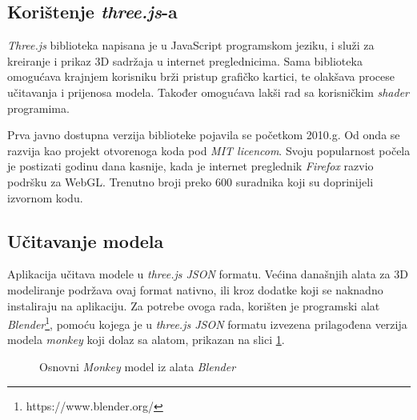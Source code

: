 \subsection{Korištenje \emph{three.js}-a}

\emph{Three.js} \cite{threejs-github} biblioteka napisana je u JavaScript programskom jeziku, i služi za kreiranje i prikaz 3D sadržaja u internet preglednicima. Sama biblioteka omogućava krajnjem korisniku brži pristup grafičko kartici, te olakšava procese učitavanja i prijenosa modela. Također omogućava lakši rad sa korisničkim \emph{shader} programima.

Prva javno dostupna verzija biblioteke pojavila se početkom 2010.g. Od onda se razvija kao projekt otvorenoga koda pod \emph{MIT licencom}. Svoju popularnost počela je postizati godinu dana kasnije, kada je internet preglednik \emph{Firefox} razvio podršku za WebGL. Trenutno broji preko 600 suradnika koji su doprinijeli izvornom kodu.

\subsection{Učitavanje modela}

Aplikacija učitava modele u \emph{three.js JSON} formatu. Većina današnjih alata za 3D modeliranje podržava ovaj format nativno, ili kroz dodatke koji se naknadno instaliraju na aplikaciju. Za potrebe ovoga rada, korišten je programski alat \emph{Blender}\footnote{https://www.blender.org/}, pomoću kojega je u \emph{three.js JSON} formatu izvezena prilagođena verzija modela \emph{monkey} koji dolaz sa alatom, prikazan na slici \ref{fig:blender-monkey}.

\begin{figure}[H]
\centering{}
\caption{Osnovni \emph{Monkey} model iz alata \emph{Blender}}
\label{fig:blender-monkey}
\end{figure}

